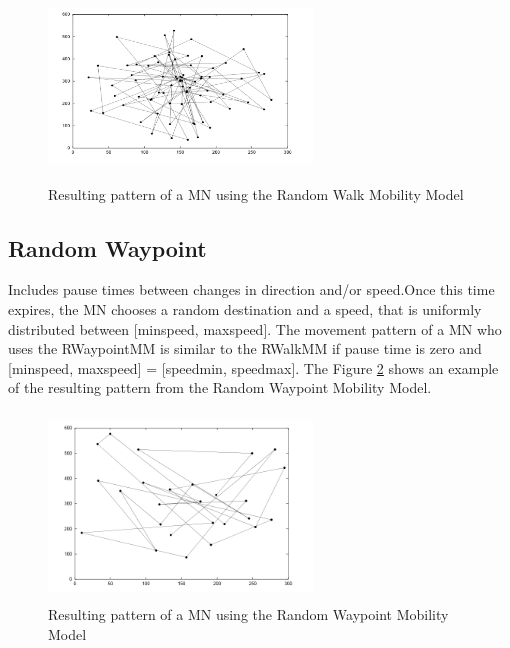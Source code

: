 \begin{figure}[h]
\center
\includegraphics[width=7cm,height=50mm]{../images/randomwalk1.png}
\caption{\label{RandomWalkFig}Resulting pattern of a MN using the Random Walk Mobility Model}
\end{figure}



\subsection{Random Waypoint}

Includes pause times between changes in direction and/or speed.Once this time expires, the MN chooses a random destination and a speed, that is uniformly distributed between [minspeed, maxspeed]. The movement pattern of a MN who uses the RWaypointMM is similar to the RWalkMM if pause time is zero and [minspeed, maxspeed] = [speedmin, speedmax]. The Figure \ref{RandomWaypointFig} shows an example of the resulting pattern from the Random Waypoint Mobility Model.

\begin{figure}[h]
\center
\includegraphics[width=7cm,height=50mm]{../images/randomwaypoint1.png}
\caption{\label{RandomWaypointFig}Resulting pattern of a MN using the Random Waypoint Mobility Model}
\end{figure}

